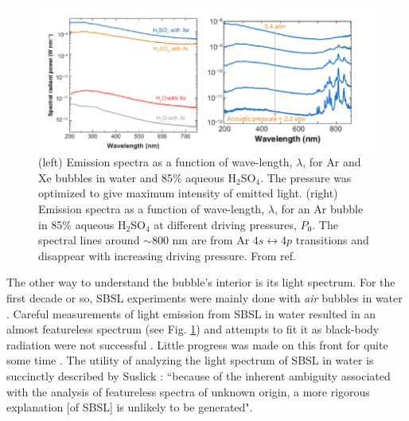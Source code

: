 \documentclass[11pt,prb,aps,nofootinbib,superscriptaddress,floatfix]{revtex4-2}
\begin{document}
\begin{figure}
\includegraphics[width=0.9\linewidth]{figs/exp.pdf}
    \caption{(left) Emission spectra as a function of wave-length, $\lambda$, for Ar and Xe bubbles in water and 85\% aqueous H$_2$SO$_4$. The pressure was optimized to give maximum intensity of emitted light. (right) Emission spectra as a function of wave-length, $\lambda$, for an Ar bubble in 85\% aqueous H$_2$SO$_4$ at different driving pressures, $P_0$. The spectral lines around $\sim 800$ nm are from Ar $4s\leftrightarrow4p$ transitions and disappear with increasing driving pressure. From ref. \cite{suslick2008inside}}
\label{fig:exp}
\end{figure}

The other way to understand the bubble's interior is its light spectrum. For the first decade or so, SBSL experiments were mainly done with \emph{air} bubbles in water \cite{suslick2008inside,brenner2002single,gaitan1992sonoluminescence}. Careful measurements of light emission from SBSL in water resulted in an almost featureless spectrum (see Fig. \ref{fig:exp}) and attempts to fit it as black-body radiation were not successful \cite{hiller1992spectrum}. Little progress was made on this front for quite some time \cite{brenner2002single}. The utility of analyzing the light spectrum of SBSL in water is succinctly described by Suslick \cite{suslick2008inside}: ``because of the inherent ambiguity associated with the analysis of featureless spectra of unknown origin, a more rigorous explanation [of SBSL] is unlikely to be generated". 
\end{document}
